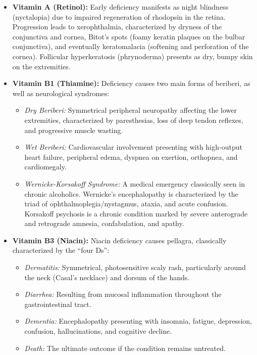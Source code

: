 \begin{itemize}
    \item \textbf{Vitamin A (Retinol):} Early deficiency manifests as night blindness (nyctalopia) due to impaired regeneration of rhodopsin in the retina. Progression leads to xerophthalmia, characterized by dryness of the conjunctiva and cornea, Bitot's spots (foamy keratin plaques on the bulbar conjunctiva), and eventually keratomalacia (softening and perforation of the cornea). Follicular hyperkeratosis (phrynoderma) presents as dry, bumpy skin on the extremities.

    \item \textbf{Vitamin B1 (Thiamine):} Deficiency causes two main forms of beriberi, as well as neurological syndromes:
    \begin{itemize}
        \item \textit{Dry Beriberi:} Symmetrical peripheral neuropathy affecting the lower extremities, characterized by paresthesias, loss of deep tendon reflexes, and progressive muscle wasting.
        \item \textit{Wet Beriberi:} Cardiovascular involvement presenting with high-output heart failure, peripheral edema, dyspnea on exertion, orthopnea, and cardiomegaly.
        \item \textit{Wernicke-Korsakoff Syndrome:} A medical emergency classically seen in chronic alcoholics. Wernicke's encephalopathy is characterized by the triad of ophthalmoplegia/nystagmus, ataxia, and acute confusion. Korsakoff psychosis is a chronic condition marked by severe anterograde and retrograde amnesia, confabulation, and apathy.
    \end{itemize}

    \item \textbf{Vitamin B3 (Niacin):} Niacin deficiency causes pellagra, classically characterized by the ``four Ds'':
    \begin{itemize}
        \item \textit{Dermatitis:} Symmetrical, photosensitive scaly rash, particularly around the neck (Casal's necklace) and dorsum of the hands.
        \item \textit{Diarrhea:} Resulting from mucosal inflammation throughout the gastrointestinal tract.
        \item \textit{Dementia:} Encephalopathy presenting with insomnia, fatigue, depression, confusion, hallucinations, and cognitive decline.
        \item \textit{Death:} The ultimate outcome if the condition remains untreated.
    \end{itemize}


\end{itemize}

